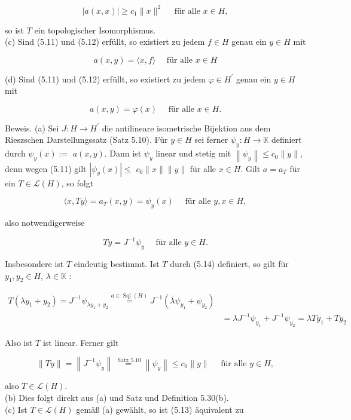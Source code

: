 \documentclass[10pt, letterpaper]{article}
\begin{document}
$$
|a(x, x)| \geq c_{1}\|x\|^{2} \quad \text { für alle } x \in H,
$$

so ist $T$ ein topologischer Isomorphismus.\\
(c) Sind (5.11) und (5.12) erfüllt, so existiert zu jedem $f \in H$ genau ein $y \in H$ mit

$$
a(x, y)=\langle x, f\rangle \quad \text { für alle } x \in H
$$

(d) Sind (5.11) und (5.12) erfüllt, so existiert zu jedem $\varphi \in H^{\prime}$ genau ein $y \in H$ mit

$$
a(x, y)=\varphi(x) \quad \text { für alle } x \in H .
$$

Beweis. (a) Sei $J: H \rightarrow H^{\prime}$ die antilineare isometrische Bijektion aus dem Rieszschen Darstellungssatz (Satz 5.10). Für $y \in H$ sei ferner $\psi_{y}: H \rightarrow \mathbb{K}$ definiert durch $\psi_{y}(x):=$ $a(x, y)$. Dann ist $\psi_{y}$ linear und stetig mit $\left\|\psi_{y}\right\| \leq c_{0}\|y\|$, denn wegen (5.11) gilt $\left|\psi_{y}(x)\right| \leq$ $c_{0}\|x\|\|y\|$ für alle $x \in H$. Gilt $a=a_{T}$ für ein $T \in \mathcal{L}(H)$, so folgt

$$
\langle x, T y\rangle=a_{T}(x, y)=\psi_{y}(x) \quad \text { für alle } y, x \in H,
$$

also notwendigerweise

$$
T y=J^{-1} \psi_{y} \quad \text { für alle } y \in H .
$$

Insbesondere ist $T$ eindeutig bestimmt. Ist $T$ durch (5.14) definiert, so gilt für $y_{1}, y_{2} \in H$, $\lambda \in \mathbb{K}$ :

$$
\begin{aligned}
T\left(\lambda y_{1}+y_{2}\right)=J^{-1} \psi_{\lambda y_{1}+y_{2}} \stackrel{a \in \operatorname{Sql}(H)}{=} J^{-1}\left(\bar{\lambda} \psi_{y_{1}}+\psi_{y_{2}}\right) & \\
& =\lambda J^{-1} \psi_{y_{1}}+J^{-1} \psi_{y_{2}}=\lambda T y_{1}+T y_{2}
\end{aligned}
$$

Also ist $T$ ist linear. Ferner gilt

$$
\|T y\|=\left\|J^{-1} \psi_{y}\right\| \stackrel{\text { Satz } 5.10}{=}\left\|\psi_{y}\right\| \leq c_{0}\|y\| \quad \text { für alle } y \in H,
$$

also $T \in \mathcal{L}(H)$.\\
(b) Dies folgt direkt aus (a) und Satz und Definition 5.30(b).\\
(c) Ist $T \in \mathcal{L}(H)$ gemäß (a) gewählt, so ist (5.13) äquivalent zu
\end{document}
